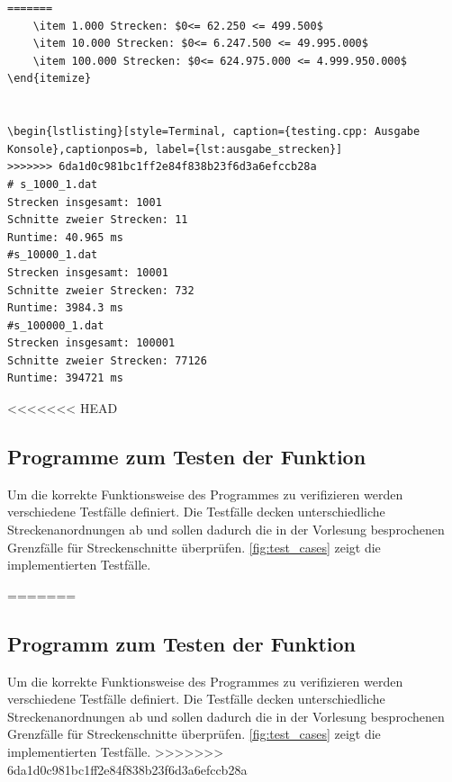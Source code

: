 \documentclass[12pt]{scrartcl}
\begin{document}
\begin{lstlisting}[style=Terminal, caption={strecken.cpp: Ausgabe Konsole},captionpos=b, label={lst:ausgabe_strecken}]
=======
    \item 1.000 Strecken: $0<= 62.250 <= 499.500$
    \item 10.000 Strecken: $0<= 6.247.500 <= 49.995.000$
    \item 100.000 Strecken: $0<= 624.975.000 <= 4.999.950.000$
\end{itemize}


\begin{lstlisting}[style=Terminal, caption={testing.cpp: Ausgabe Konsole},captionpos=b, label={lst:ausgabe_strecken}]
>>>>>>> 6da1d0c981bc1ff2e84f838b23f6d3a6efccb28a
# s_1000_1.dat
Strecken insgesamt: 1001
Schnitte zweier Strecken: 11
Runtime: 40.965 ms
#s_10000_1.dat
Strecken insgesamt: 10001
Schnitte zweier Strecken: 732
Runtime: 3984.3 ms
#s_100000_1.dat
Strecken insgesamt: 100001
Schnitte zweier Strecken: 77126
Runtime: 394721 ms
\end{lstlisting}


<<<<<<< HEAD
\subsection{Programme zum Testen der Funktion}
Um die korrekte Funktionsweise des Programmes zu verifizieren werden verschiedene Testfälle definiert.
Die Testfälle decken unterschiedliche Streckenanordnungen ab und sollen dadurch die in der Vorlesung besprochenen Grenzfälle für Streckenschnitte überprüfen.
\autoref{fig:test_cases} zeigt die implementierten Testfälle.

=======
\subsection{Programm zum Testen der Funktion}
Um die korrekte Funktionsweise des Programmes zu verifizieren werden verschiedene Testfälle definiert.
Die Testfälle decken unterschiedliche Streckenanordnungen ab und sollen dadurch die in der Vorlesung besprochenen Grenzfälle für Streckenschnitte überprüfen.
\autoref{fig:test_cases} zeigt die implementierten Testfälle.
>>>>>>> 6da1d0c981bc1ff2e84f838b23f6d3a6efccb28a
\end{document}

